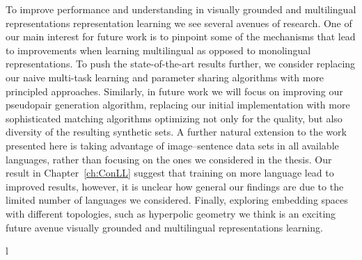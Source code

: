 To improve performance and understanding in visually grounded and multilingual 
representations representation learning we see several avenues of research. 
One of our main interest for future work is to pinpoint some of the mechanisms that lead to 
improvements when learning multilingual as opposed to monolingual representations. To push the state-of-the-art
results further, we consider replacing our naive multi-task learning and parameter sharing algorithms with 
more principled approaches. Similarly, in future work we will focus on improving our pseudopair generation 
algorithm, replacing our initial implementation with more sophisticated matching algorithms optimizing not
only for the quality, but also diversity of the resulting synthetic sets.
A further natural extension to the work presented here is taking advantage 
of image--sentence data sets in all available languages, rather than focusing on the ones we considered 
in the thesis. Our result in Chapter~\ref{ch:ConLL} suggest that training on more language lead to improved results,
however, it is unclear how general our findings are due to the limited number of languages we considered.
Finally, exploring embedding spaces with different topologies, such as hyperpolic geometry we think is an exciting
future avenue visually grounded and multilingual representations learning.









l%







